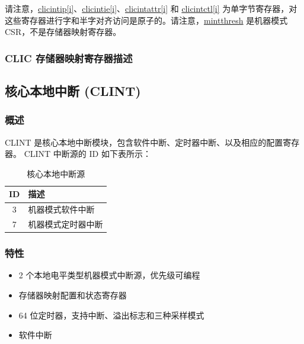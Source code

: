 \documentclass[main\_\_CN.tex]{subfiles}
\begin{document}
请注意，\hyperref[regdesc:MCLICINTIP_REG_i]{clicintip[i]}、\hyperref[regdesc:MCLICINTIE_REG_i]{clicintie[i]}、\hyperref[regdesc:MCLICINTATTR_REG_i]{clicintattr[i]} 和 \hyperref[regdesc:MCLICINTCTL_REG_i]{clicintctl[i]} 为单字节寄存器，对这些寄存器进行字和半字对齐访问是原子的。请注意，\hyperref[regdesc:MINTTHRESH]{mintthresh} 是机器模式 CSR，不是存储器映射寄存器。





\hypertarget{riscvcpu-clic-memmap-reg}{}
\subsubsection{CLIC 存储器映射寄存器描述}
\label{sec:riscvcpu-clic-memmap-reg}



\newpage
\subsection{核心本地中断 (CLINT)}
\label{sec:riscvcpu-clint}
\subsubsection{概述}
\label{sec:riscvcpu-clint-overview}
CLINT 是核心本地中断模块，包含软件中断、定时器中断、以及相应的配置寄存器。
CLINT 中断源的 ID 如下表所示：

\begin{longtable}{ | c | l | }
\caption{核心本地中断源} \label{tab:riscvcpu-clint-table}
\\ \hline
\rowcolor{lightgray}
ID & 描述 \\ \hline
3 & 机器模式软件中断 \\ \hline
7 & 机器模式定时器中断 \\ \hline
\end{longtable}


\subsubsection{特性}
\begin{itemize}
\item 2 个本地电平类型机器模式中断源，优先级可编程
\item 存储器映射配置和状态寄存器
\item 64 位定时器，支持中断、溢出标志和三种采样模式
\item 软件中断
\end{itemize}
\end{document}
